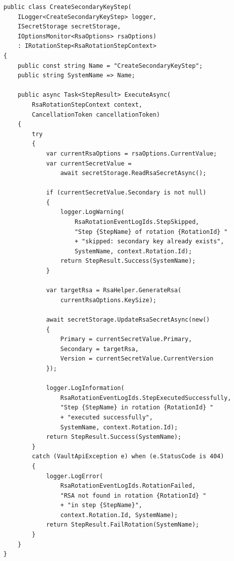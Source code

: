 \begin{lstlisting}[language={[Sharp]C},
  label={lst:app-create-secondary},
  caption={Класс CreateSecondaryKeyStep: первый шаг ротации ключей}]
public class CreateSecondaryKeyStep(
    ILogger<CreateSecondaryKeyStep> logger,
    ISecretStorage secretStorage,
    IOptionsMonitor<RsaOptions> rsaOptions)
    : IRotationStep<RsaRotationStepContext>
{
    public const string Name = "CreateSecondaryKeyStep";
    public string SystemName => Name;

    public async Task<StepResult> ExecuteAsync(
        RsaRotationStepContext context,
        CancellationToken cancellationToken)
    {
        try
        {
            var currentRsaOptions = rsaOptions.CurrentValue;
            var currentSecretValue =
                await secretStorage.ReadRsaSecretAsync();

            if (currentSecretValue.Secondary is not null)
            {
                logger.LogWarning(
                    RsaRotationEventLogIds.StepSkipped,
                    "Step {StepName} of rotation {RotationId} "
                    + "skipped: secondary key already exists",
                    SystemName, context.Rotation.Id);
                return StepResult.Success(SystemName);
            }

            var targetRsa = RsaHelper.GenerateRsa(
                currentRsaOptions.KeySize);

            await secretStorage.UpdateRsaSecretAsync(new()
            {
                Primary = currentSecretValue.Primary,
                Secondary = targetRsa,
                Version = currentSecretValue.CurrentVersion
            });

            logger.LogInformation(
                RsaRotationEventLogIds.StepExecutedSuccessfully,
                "Step {StepName} in rotation {RotationId} "
                + "executed successfully",
                SystemName, context.Rotation.Id);
            return StepResult.Success(SystemName);
        }
        catch (VaultApiException e) when (e.StatusCode is 404)
        {
            logger.LogError(
                RsaRotationEventLogIds.RotationFailed,
                "RSA not found in rotation {RotationId} "
                + "in step {StepName}",
                context.Rotation.Id, SystemName);
            return StepResult.FailRotation(SystemName);
        }
    }
}
\end{lstlisting}

